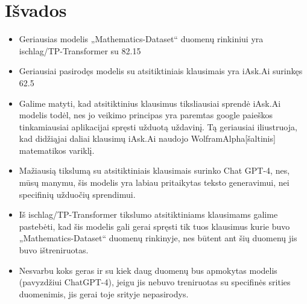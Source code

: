 \documentclass[conference]{IEEEtran}
\begin{document}
\section{Išvados}
\begin{itemize}
    \item Geriausias modelis „Mathematics-Dataset“ duomenų rinkiniui yra ischlag/TP-Transformer su 82.15%
    \item Geriausiai pasirodęs modelis su atsitiktiniais klausimais yra iAsk.Ai surinkęs 62.5%
    \item Galime matyti, kad atsitiktinius klausimus tiksliausiai sprendė iAsk.Ai modelis todėl, nes jo veikimo principas yra paremtas google paieškos tinkamiausiai aplikacijai spręsti užduotą uždavinį. Tą geriausiai iliustruoja, kad didžiąjai daliai klausimų iAsk.Ai naudojo WolframAlpha[šaltinis] matematikos variklį.
    \item Mažiausią tikslumą su atsitiktiniais klausimais surinko Chat GPT-4, nes, mūsų manymu, šis modelis yra labiau pritaikytas teksto generavimui, nei specifinių užduočių sprendimui.
    \item Iš ischlag/TP-Transformer tikslumo atsitiktiniams klausimams galime pastebėti, kad šis modelis gali gerai spręsti tik tuos klausimus kurie buvo „Mathematics-Dataset“ duomenų rinkinyje, nes būtent ant šių duomenų jis buvo ištreniruotas.
    \item Nesvarbu koks geras ir su kiek daug duomenų bus apmokytas modelis (pavyzdžiui ChatGPT-4), jeigu jis nebuvo treniruotas su specifinės srities duomenimis, jis gerai toje srityje nepasirodys.
\end{itemize}



\end{document}
